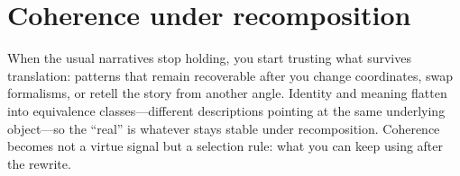 \part{Coherence under recomposition}
\epigraph{When the usual narratives stop holding, you start trusting what survives translation: patterns that remain recoverable after you change coordinates, swap formalisms, or retell the story from another angle. Identity and meaning flatten into equivalence classes---different descriptions pointing at the same underlying object---so the ``real'' is whatever stays stable under recomposition. Coherence becomes not a virtue signal but a selection rule: what you can keep using after the rewrite.}{}
\clearpage
